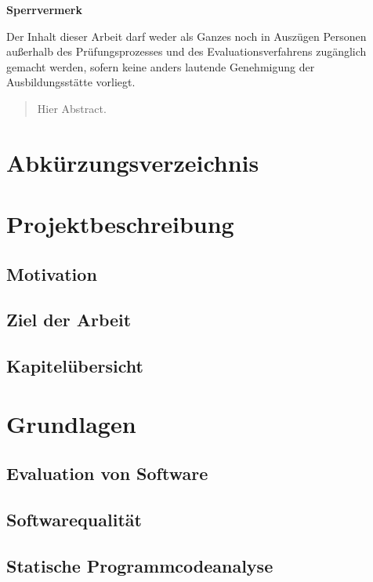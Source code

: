 \documentclass[a4paper, 11pt]{article}
\makeatletter
\newcommand*{\maintoc}{%
	\begingroup
	\@fileswfalse%
	\renewcommand*{\appendixattoc}{%
		\value{tocdepth}=-10000 %
	}%
	\tableofcontents%
	\endgroup
}
\newcommand*{\appendixattoc}{%
}
\makeatother
\begin{document}
\newpage
\begin{framed}
	\begin{center}
		\Large\bfseries Sperrvermerk
	\end{center}
	\medskip
	\noindent
	Der Inhalt dieser Arbeit darf weder als Ganzes noch in Auszügen Personen
	außerhalb des Prüfungsprozesses und des Evaluationsverfahrens zugänglich gemacht
	werden, sofern keine anders lautende Genehmigung der Ausbildungsstätte vorliegt.
\end{framed}
\newpage
{} 
\begin{abstract}
Hier Abstract.
\end{abstract}
\newpage
\maintoc           %
\newpage
\listoffigures             %
\newpage
\listoftables              %
\newpage
\section*{\Large \textbf Abkürzungsverzeichnis}  
\begin{acronym}[Bash]
\end{acronym}
\newpage
{} 
\section{Projektbeschreibung}
\subsection{Motivation}
\subsection{Ziel der Arbeit}
\subsection{Kapitelübersicht}
\section{Grundlagen}
\subsection{Evaluation von Software}
\subsection{Softwarequalität}
\subsection{Statische Programmcodeanalyse}
\end{document}
